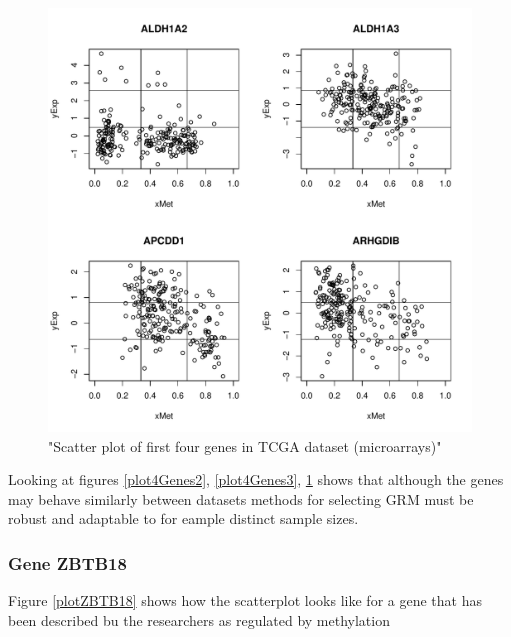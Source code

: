 \documentclass[a4paper,10pt]{article}\usepackage[]{graphicx}\usepackage[]{color}
\makeatletter
\def\maxwidth{ %
  \ifdim\Gin@nat@width>\linewidth
    \linewidth
  \else
    \Gin@nat@width
  \fi
}
\newenvironment{knitrout}{}{} %
\makeatother
\begin{document}
\begin{figure}
\begin{knitrout}
\color{fgcolor}
\includegraphics[width=\maxwidth]{figure/plot4Genes4-1} 

\end{knitrout}
\caption{"Scatter plot of first four genes in TCGA dataset (microarrays)"\label{plot4Genes4}}
\end{figure}

Looking at figures \ref{plot4Genes2}, \ref{plot4Genes3}, \ref{plot4Genes4} shows that although the genes may behave similarly  between datasets methods for selecting GRM must be robust and adaptable to for eample distinct sample sizes.

\subsubsection{Gene ZBTB18}

Figure \ref{plotZBTB18} shows how the scatterplot looks like for a gene that has been described bu the researchers as regulated by methylation
\end{document}

